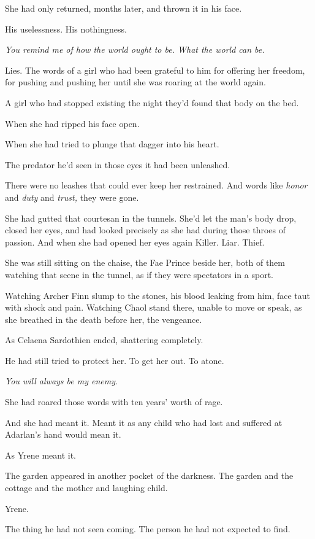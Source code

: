 She had only returned, months later, and thrown it in his face.

His uselessness. His nothingness.

\emph{You remind me of how the world ought to be. What the world can be.}

Lies. The words of a girl who had been grateful to him for offering her freedom, for pushing and pushing her until she was roaring at the world again.

A girl who had stopped existing the night they'd found that body on the bed.

When she had ripped his face open.

When she had tried to plunge that dagger into his heart.

The predator he'd seen in those eyes  it had been unleashed.

There were no leashes that could ever keep her restrained. And words like \emph{honor} and \emph{duty} and \emph{trust,} they were gone.

She had gutted that courtesan in the tunnels. She'd let the man's body drop, closed her eyes, and had looked precisely as she had during those throes of passion. And when she had opened her eyes again 
Killer. Liar. Thief.

She was still sitting on the chaise, the Fae Prince beside her, both of them watching that scene in the tunnel, as if they were spectators in a sport.

Watching Archer Finn slump to the stones, his blood leaking from him, face taut with shock and pain. Watching Chaol stand there, unable to move or speak, as she breathed in the death before her, the vengeance.

As Celaena Sardothien ended, shattering completely.

He had still tried to protect her. To get her out. To atone.

\emph{You will always be my enemy}.

She had roared those words with ten years' worth of rage.

And she had meant it. Meant it as any child who had lost and suffered at Adarlan's hand would mean it.

As Yrene meant it.

The garden appeared in another pocket of the darkness. The garden and the cottage and the mother and laughing child.

Yrene.

The thing he had not seen coming. The person he had not expected to find.

